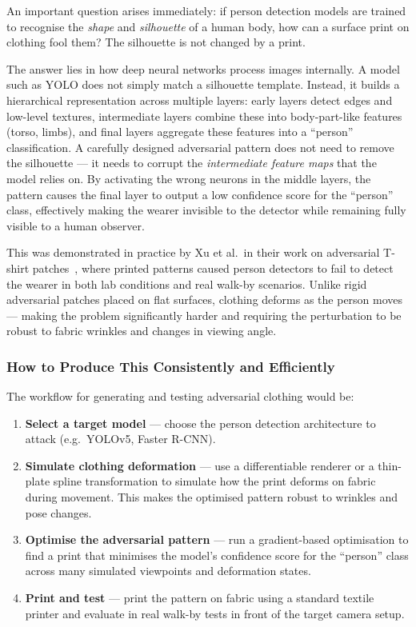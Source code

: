 \documentclass[12pt, a4paper]{article}
\begin{document}
An important question arises immediately: if person detection models are
trained to recognise the \emph{shape} and \emph{silhouette} of a human
body, how can a surface print on clothing fool them? The silhouette is
not changed by a print.

The answer lies in how deep neural networks process images internally.
A model such as YOLO does not simply match a silhouette template. Instead,
it builds a hierarchical representation across multiple layers:
early layers detect edges and low-level textures, intermediate layers
combine these into body-part-like features (torso, limbs), and final
layers aggregate these features into a ``person'' classification.
A carefully designed adversarial pattern does not need to remove the
silhouette — it needs to corrupt the \emph{intermediate feature maps}
that the model relies on. By activating the wrong neurons in the middle
layers, the pattern causes the final layer to output a low confidence
score for the ``person'' class, effectively making the wearer invisible
to the detector while remaining fully visible to a human observer.

This was demonstrated in practice by Xu et al.\ in their work on
adversarial T-shirt patches~\cite{xu2020}, where printed patterns
caused person detectors to fail to detect the wearer in both lab
conditions and real walk-by scenarios. Unlike rigid adversarial patches
placed on flat surfaces, clothing deforms as the person moves —
making the problem significantly harder and requiring the perturbation
to be robust to fabric wrinkles and changes in viewing angle.

\subsubsection*{How to Produce This Consistently and Efficiently}

The workflow for generating and testing adversarial clothing would be:

\begin{enumerate}
    \item \textbf{Select a target model} — choose the person detection
    architecture to attack (e.g.\ YOLOv5, Faster R-CNN).

    \item \textbf{Simulate clothing deformation} — use a differentiable
    renderer or a thin-plate spline transformation to simulate how
    the print deforms on fabric during movement. This makes the
    optimised pattern robust to wrinkles and pose changes.

    \item \textbf{Optimise the adversarial pattern} — run a gradient-based
    optimisation to find a print that minimises the model's confidence
    score for the ``person'' class across many simulated viewpoints
    and deformation states.

    \item \textbf{Print and test} — print the pattern on fabric using
    a standard textile printer and evaluate in real walk-by tests
    in front of the target camera setup.
\end{enumerate}
\end{document}
